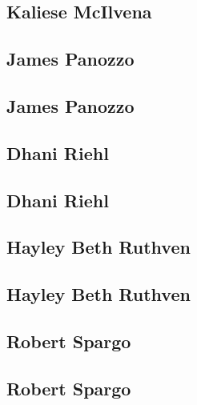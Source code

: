 \documentclass[twoside,14pt,a4paper,notitlepage]{memoir}
\begin{document}
\lipsum[1-2]
\subsection*{Kaliese McIlvena}
\lipsum[3]



\subsection*{James Panozzo}
\label{aut:panozzo}

\lipsum[1-2]
\subsection*{James Panozzo}
\lipsum[3]



\subsection*{Dhani Riehl}
\label{aut:riehl}

\lipsum[1-2]
\subsection*{Dhani Riehl}
\lipsum[3]



\subsection*{Hayley Beth Ruthven}
\label{aut:ruthven}

\lipsum[1-2]
\subsection*{Hayley Beth Ruthven}
\lipsum[3]



\subsection*{Robert Spargo}
\label{aut:spargo}

\lipsum[1-2]
\subsection*{Robert Spargo}
\lipsum[3]
\end{document}
